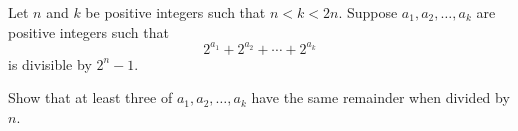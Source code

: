 Let $n$ and $k$ be positive integers such that $n<k<2n$. Suppose $a_1,a_2,\ldots,a_k$ are positive integers such that
\[
2^{a_1}+2^{a_2}+\cdots+2^{a_k}
\]
is divisible by $2^n-1$.

Show that at least three of $a_1,a_2,\ldots,a_k$ have the same remainder when divided by $n$.
